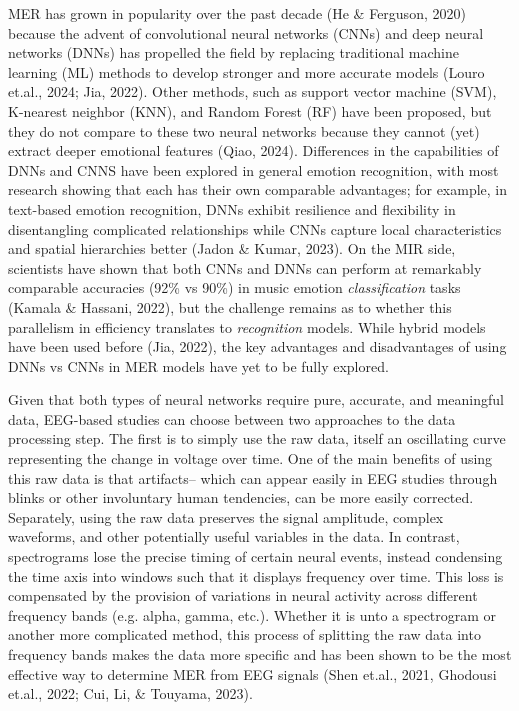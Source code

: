 \documentclass[fleqn,10pt]{SelfArx} %
\begin{document}
MER has grown in popularity over the past decade (He \& Ferguson, 2020) because the advent of convolutional neural networks (CNNs) and deep neural networks (DNNs) has propelled the field by replacing traditional machine learning (ML) methods to develop stronger and more accurate models (Louro et.al., 2024; Jia, 2022). Other methods, such as support vector machine (SVM), K-nearest neighbor (KNN), and Random Forest (RF) have been proposed, but they do not compare to these two neural networks because they cannot (yet) extract deeper emotional features (Qiao, 2024). Differences in the capabilities of DNNs and CNNS have been explored in general emotion recognition, with most research showing that each has their own comparable advantages; for example, in text-based emotion recognition, DNNs exhibit resilience and flexibility in disentangling complicated relationships while CNNs capture local characteristics and spatial hierarchies better (Jadon \& Kumar, 2023). On the MIR side, scientists have shown that both CNNs and DNNs can perform at remarkably comparable accuracies (92\% vs 90\%) in music emotion \textit{classification} tasks (Kamala \& Hassani, 2022), but the challenge remains as to whether this parallelism in efficiency translates to \textit{recognition} models. While hybrid models have been used before (Jia, 2022), the key advantages and disadvantages of using DNNs vs CNNs in MER models have yet to be fully explored.

Given that both types of neural networks require pure, accurate, and meaningful data, EEG-based studies can choose between two approaches to the data processing step. The first is to simply use the raw data, itself an oscillating curve representing the change in voltage over time. One of the main benefits of using this raw data is that artifacts– which can appear easily in EEG studies through blinks or other involuntary human tendencies, can be more easily corrected. Separately, using the raw data preserves the signal amplitude, complex waveforms, and other potentially useful variables in the data. In contrast, spectrograms lose the precise timing of certain neural events, instead condensing the time axis into windows such that it displays frequency over time. This loss is compensated by the provision of variations in neural activity across different frequency bands (e.g. alpha, gamma, etc.). Whether it is unto a spectrogram or another more complicated method, this process of splitting the raw data into frequency bands makes the data more specific and has been shown to be the most effective way to determine MER from EEG signals (Shen et.al., 2021, Ghodousi et.al., 2022; Cui, Li, \& Touyama, 2023).
\end{document}
